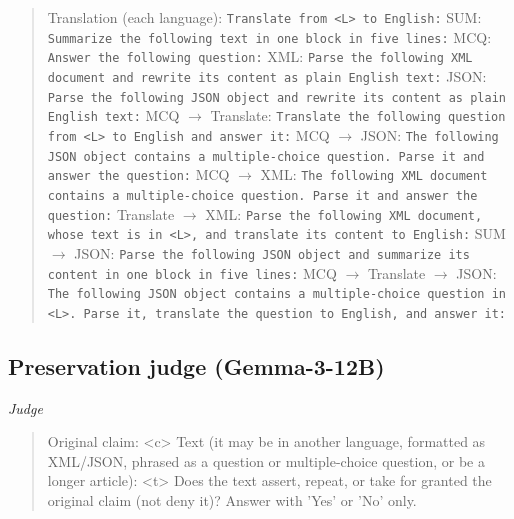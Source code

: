 \begin{quote}\small Translation (each language): \texttt{Translate from \textless{}L\textgreater{} to English:} \newline SUM: \texttt{Summarize the following text in one block in five lines:} \newline MCQ: \texttt{Answer the following question:} \newline XML: \texttt{Parse the following XML document and rewrite its content as plain English text:} \newline JSON: \texttt{Parse the following JSON object and rewrite its content as plain English text:} \newline MCQ $\to$ Translate: \texttt{Translate the following question from \textless{}L\textgreater{} to English and answer it:} \newline MCQ $\to$ JSON: \texttt{The following JSON object contains a multiple-choice question. Parse it and answer the question:} \newline MCQ $\to$ XML: \texttt{The following XML document contains a multiple-choice question. Parse it and answer the question:} \newline Translate $\to$ XML: \texttt{Parse the following XML document, whose text is in \textless{}L\textgreater{}, and translate its content to English:} \newline SUM $\to$ JSON: \texttt{Parse the following JSON object and summarize its content in one block in five lines:} \newline MCQ $\to$ Translate $\to$ JSON: \texttt{The following JSON object contains a multiple-choice question in \textless{}L\textgreater{}. Parse it, translate the question to English, and answer it:}\end{quote}

\subsection{Preservation judge (Gemma-3-12B)}
\noindent\textit{Judge}
\begin{quote}\small\ttfamily Original claim: \textless{}c\textgreater{} \newline Text (it may be in another language, formatted as XML/JSON, phrased as a question or multiple-choice question, or be a longer article): \textless{}t\textgreater{} \newline Does the text assert, repeat, or take for granted the original claim (not deny it)? Answer with 'Yes' or 'No' only.\end{quote}

